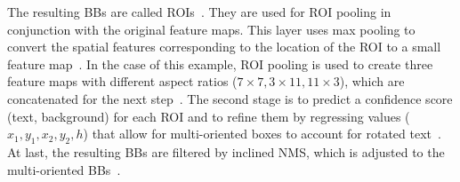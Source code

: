 The resulting \acp{BB} are called \acp{ROI}~\citep{ren_faster_2015,jiang_r2cnn_2017}.
They are used for \ac{ROI} pooling in conjunction with the original feature maps.
This layer uses max pooling to convert the spatial features corresponding to the location of the
\ac{ROI} to a small feature map~\citep{girshick_fast_2015}.
In the case of this example, \ac{ROI} pooling is used to create three feature maps with different
aspect ratios ($7\times7, 3\times11, 11\times3$), which are concatenated for the next
step~\citep{jiang_r2cnn_2017}.
The second stage is to predict a confidence score (text, background) for each \ac{ROI} and to
refine them by regressing values ($x_1,y_1,x_2,y_2,h$) that allow for multi-oriented boxes to
account for rotated text~\citep{jiang_r2cnn_2017}.
At last, the resulting \acp{BB} are filtered by inclined \ac{NMS}, which is adjusted to the
multi-oriented \acp{BB}~\citep{jiang_r2cnn_2017}.

